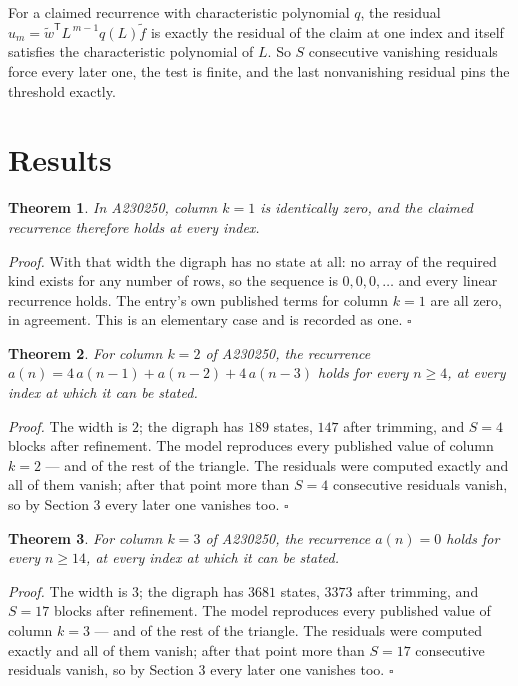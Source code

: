 \documentclass[11pt]{article}
\newtheorem{theorem}{Theorem}
\theoremstyle{definition}
\begin{document}
For a claimed recurrence with characteristic polynomial $q$, the residual $u_m = \tilde w^{\mathsf T}L^{\,m-1}q(L)\tilde f$ is exactly the residual of the claim at one index and itself satisfies the characteristic polynomial of $L$. So $S$ consecutive vanishing residuals force every later one, the test is finite, and the last nonvanishing residual pins the threshold exactly.

\section{Results}

\begin{theorem} In A230250, column $k = 1$ is identically zero, and the claimed recurrence therefore holds at every index.\end{theorem}

{\itshape Proof.} With that width the digraph has no state at all: no array of the required kind exists for any number of rows, so the sequence is $0,0,0,\dots$ and every linear recurrence holds. The entry's own published terms for column $k = 1$ are all zero, in agreement. This is an elementary case and is recorded as one. $\square$

\begin{theorem} For column $k = 2$ of A230250, the recurrence $a(n) = 4\,a(n-1) + a(n-2) + 4\,a(n-3)$ holds for every $n \ge 4$, at every index at which it can be stated.\end{theorem}

{\itshape Proof.} The width is $2$; the digraph has $189$ states, $147$ after trimming, and $S = 4$ blocks after refinement. The model reproduces every published value of column $k = 2$ --- and of the rest of the triangle. The residuals were computed exactly and all of them vanish; after that point more than $S = 4$ consecutive residuals vanish, so by Section 3 every later one vanishes too. $\square$

\begin{theorem} For column $k = 3$ of A230250, the recurrence $a(n) = 0$ holds for every $n \ge 14$, at every index at which it can be stated.\end{theorem}

{\itshape Proof.} The width is $3$; the digraph has $3681$ states, $3373$ after trimming, and $S = 17$ blocks after refinement. The model reproduces every published value of column $k = 3$ --- and of the rest of the triangle. The residuals were computed exactly and all of them vanish; after that point more than $S = 17$ consecutive residuals vanish, so by Section 3 every later one vanishes too. $\square$
\end{document}
